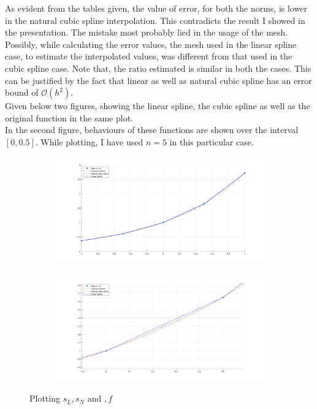 \documentclass[12pt]{article}
\begin{document}
\newpage
As evident from the tables given, the value of error, for both the norms, is lower in the natural cubic spline interpolation. This contradicts the result I showed in the presentation. The mistake most probably lied in the usage of the mesh. Possibly, while calculating the error values, the mesh used in the linear spline case, to estimate the interpolated values, was different from that used in the cubic spline case. Note that, the ratio estimated is similar in both the cases. This can be justified by the fact that linear as well as natural cubic spline has an error bound of $\mathcal{O}(h^2)$.\\
Given below two figures, showing the linear spline, the cubic spline as well as the original function in the same plot.\\
In the second figure, behaviours of these functions are shown over the interval $[0, 0.5]$. While plotting, I have used $n = 5$ in this particular case.

\begin{figure}
\centering
\begin{subfigure}{0.47\textwidth}
    \includegraphics[width=\textwidth]{comp_5_1.png}
\end{subfigure}
\begin{subfigure}{0.47\textwidth}
    \includegraphics[width=\textwidth]{comp_5_2.png}
\end{subfigure}
        
\caption{Plotting $s_L, s_N \text{ and }, f$}
\end{figure}
\end{document}
